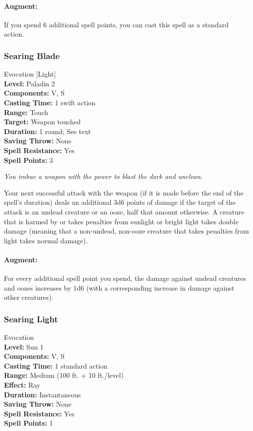 \paragraph{Augment:} If you spend 6 additional spell points, you can cast this spell as a standard action.
\subsubsection{Searing Blade}
\label{Spell:SearingBlade}
Evocation [Light]
\\ \textbf{Level:} Paladin 2
\\ \textbf{Components:} V, S
\\ \textbf{Casting Time:} 1 swift action
\\ \textbf{Range:} Touch
\\ \textbf{Target:} Weapon touched
\\ \textbf{Duration:} 1 round; See text
\\ \textbf{Saving Throw:} None
\\ \textbf{Spell Resistance:} Yes
\\ \textbf{Spell Points:} 3

\emph{You imbue a weapon with the power to blast the dark and unclean.}

Your next successful attack with the weapon (if it is made before the end of the spell's duration) deals an additional 3d6 points of damage if the target of the attack is an undead creature or an ooze, half that amount otherwise.
A creature that is harmed by or takes penalties from sunlight or bright light takes double damage
(meaning that a non-undead, non-ooze creature that takes penalties from light takes normal damage).

\paragraph{Augment:} For every additional spell point you spend, the damage against undead creatures and oozes increases by 1d6 (with a corresponding increase in damage against other creatures).
\subsubsection{Searing Light}
\label{Spell:SearingLight}
Evocation
\\ \textbf{Level:} Sun 1
\\ \textbf{Components:} V, S
\\ \textbf{Casting Time:} 1 standard action
\\ \textbf{Range:} Medium (100 ft. + 10 ft./level)
\\ \textbf{Effect:} Ray
\\ \textbf{Duration:} Instantaneous
\\ \textbf{Saving Throw:} None
\\ \textbf{Spell Resistance:} Yes
\\ \textbf{Spell Points:} 1

